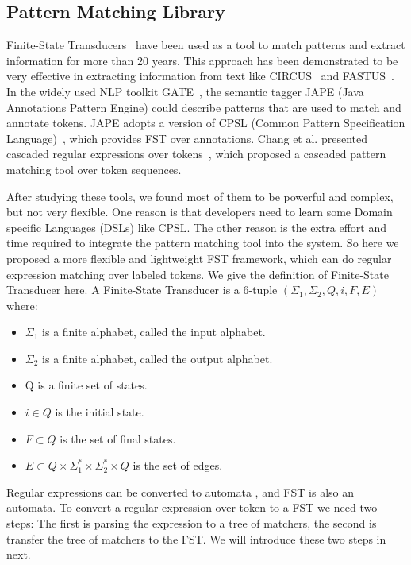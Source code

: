 \subsection{Pattern Matching Library}
\label{subsec1}

Finite-State Transducers~\cite{roche1997finite} have been used as a tool to match patterns and extract information for more than 20 years. This approach has been demonstrated to be very effective in extracting information from text like CIRCUS~\cite{lehnert1991university} and FASTUS~\cite{hobbs199713}.  In the widely used NLP toolkit GATE~\cite{cunningham2002framework}, the semantic tagger JAPE (Java Annotations Pattern Engine) could describe patterns that are used to match and annotate tokens. JAPE adopts a version of CPSL (Common Pattern  Specification Language)~\cite{appelt1998common}, which provides FST over annotations. Chang et al. presented cascaded regular expressions over tokens~\cite{chang2014tokensregex}, which proposed a cascaded pattern matching tool over token sequences.

After studying these tools, we found most of them to be powerful and complex, but not very flexible. One reason is that developers need to learn some Domain specific Languages (DSLs) like CPSL. The other reason is the extra effort and time required to integrate the pattern matching tool into the system. So here we proposed a more flexible and lightweight FST framework, which can do regular expression matching over labeled tokens. We give the definition of Finite-State Transducer here. A Finite-State Transducer is a 6-tuple $(\Sigma_1, \Sigma_2, Q, i, F, E)$ where:
\begin{itemize}
  \item $\Sigma_1$ is a finite alphabet, called the input alphabet.
  \item $\Sigma_2$ is a finite alphabet, called the output alphabet.
  \item Q is a finite set of states.
  \item $i \in Q$ is the initial state.
  \item $F \subset Q$ is the set of final states.
  \item $E \subset  Q  \times \Sigma_1^* \times \Sigma_2^* \times Q$ is the set of edges.
\end{itemize}

Regular expressions can be converted to automata \cite{aho1992foundations}, and FST is also an automata. To convert a regular expression over token to a FST we need two steps: The first is parsing the expression to a tree of matchers, the second is transfer the tree of matchers to the FST. We will introduce these two steps in next.

